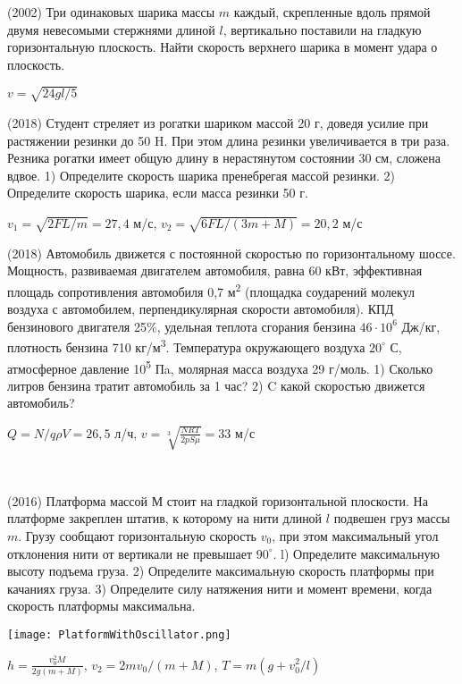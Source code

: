 \begin{ex}
(2002) Три одинаковых шарика массы $m$ каждый, скрепленные вдоль прямой двумя невесомыми стержнями длиной $l$, вертикально поставили на гладкую горизонтальную плоскость. Найти скорость верхнего шарика в момент удара о плоскость.
\begin{ans}
$v = \sqrt{24gl/5}$
\end{ans}
\end{ex}

\begin{ex}
(2018) Студент стреляет из рогатки шариком массой 20 г, доведя усилие при растяжении резинки до 50 H. При этом длина резинки увеличивается в три раза. Резника рогатки имеет общую длину в нерастянутом состоянии 30 см, сложена вдвое. 1) Определите скорость шарика пренебрегая массой резинки. 2) Определите скорость шарика, если масса резинки 50 г.
\begin{ans}
$v_1 = \sqrt{2FL/m}=27,4$ м/с, $v_2 = \sqrt{6FL/(3m+M)} = 20,2$ м/с
\end{ans}
\end{ex}

\begin{ex}
(2018) Автомобиль движется с постоянной скоростью по горизонтальному шоссе. Мощность, развиваемая двигателем
автомобиля, равна 60 кВт, эффективная площадь сопротивления автомобиля 0,7 м\textsuperscript{2} (площадка соударений молекул воздуха с автомобилем, перпендикулярная скорости автомобиля). КПД бензинового двигателя 25\%, удельная теплота сгорания бензина $46 \cdot 10^6$ Дж/кг, плотность бензина 710 кг/м\textsuperscript{3}. Температура окружающего воздуха $20^{\circ}$ С, атмосферное давление 10\textsuperscript{5} Пa, молярная масса воздуха 29 г/моль. 1) Сколько литров бензина тратит автомобиль за 1 час? 2) C какой скоростью движется автомобиль?
\begin{ans}
$Q = N/q \rho V = 26,5$ л/ч,  $v=\sqrt[3]{\frac{NRT}{2pS\mu}}=33$ м/с
\end{ans}
\end{ex}

\begin{ex}
\hspace{0pt} \\
\begin{minipage}{.65\textwidth}
(2016) Платформа массой $М$ стоит на гладкой горизонтальной плоскости. На платформе закреплен штатив, к которому на нити длиной $l$ подвешен груз массы $m$. Грузу сообщают горизонтальную скорость $v_0$, при этом максимальный угол отклонения нити от вертикали не превышает $90^{\circ}$. l) Определите максимальную высоту подъема груза. 2) Определите максимальную скорость платформы при качаниях груза. 3) Определите силу натяжения нити и момент времени, когда скорость платформы максимальна.
\end{minipage}
\begin{minipage}{.35\textwidth}
\centering
\texttt{[image: PlatformWithOscillator.png]}
\end{minipage}
\begin{ans}
$h= \frac{v_0^2 M}{2g(m+M)}$, $v_2 = 2mv_0/(m+M)$, $T=m(g+v_0^2/l)$
\end{ans}
\end{ex}